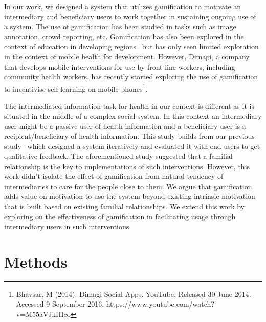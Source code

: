 \documentclass{sig-alternate}
\begin{document}
In our work, we designed a system that  utilizes gamification to motivate an intermediary and beneficiary users to work together in sustaining ongoing use of a system. The use of gamification has been studied in tasks such as image annotation\cite{mekler2013:disassembling}, crowd reporting\cite{crowley2012:gamification}, etc. Gamification has also been explored in the context of education in developing regions~\cite{kam2008designing,botha2015icts} but has only seen limited exploration in the context of mobile health for development.  However, Dimagi, a company that develops mobile interventions for use by front-line workers, including community health workers, has recently started exploring the use of gamification to incentivise self-learning on mobile phones\footnote{Bhavsar, M (2014). Dimagi Social Apps. YouTube. Released 30 June 2014. Accessed 9 September 2016. https://www.youtube.com/watch?v=M55aVJkHIco}.

The intermediated information task for health in our context is different as it is situated in the middle of a complex social system. In this context an intermediary  user might be a passive user of health information and a beneficiary user is a recipient/beneficiary of health information. This study builds from our previous study~\cite{katule2016:leveraging} which designed a system iteratively and evaluated it with end users to get qualitative feedback. The aforementioned study suggested that a familial relationship is the key to implementations of such interventions. However, this work didn't isolate the effect of gamification from natural tendency of intermediaries to care for the people close to them. We argue that gamification adds value on motivation to use the system beyond existing intrinsic motivation that is built based on existing familial relationships. We extend this work by exploring on the effectiveness of gamification in facilitating usage through intermediary users in such interventions.
\section{Methods}
\end{document}
